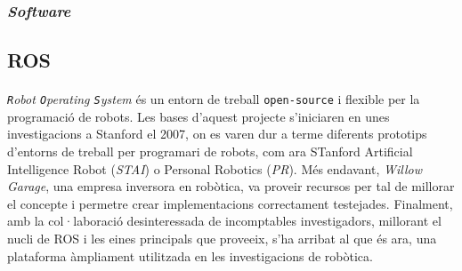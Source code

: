 \documentclass[12pt,a4paper,final,twoside]{article}
\begin{document}


\label{Software}
\subsubsection{\textit{Software}}


  


\subsection{ROS}
\label{ROS}
\paragraph{}\textit{\texttt{R}obot \texttt{O}perating \texttt{S}ystem} \cite{ROS} és un entorn de treball \texttt{open-source} i flexible per la programació de robots. Les bases d'aquest projecte s'iniciaren en unes investigacions a Stanford el 2007, on es varen dur a terme diferents prototips d'entorns de treball per programari de robots, com ara STanford Artificial Intelligence Robot (\textit{STAI}) o Personal Robotics (\textit{PR}). Més endavant, \textit{Willow Garage}, una empresa inversora en robòtica, va proveir recursos per tal de millorar el concepte i permetre crear implementacions correctament testejades. Finalment, amb la col·laboració desinteressada de incomptables investigadors, millorant el nucli de ROS i les eines principals que proveeix, s'ha arribat al que és ara, una plataforma àmpliament utilitzada en les investigacions de robòtica.
\end{document}
